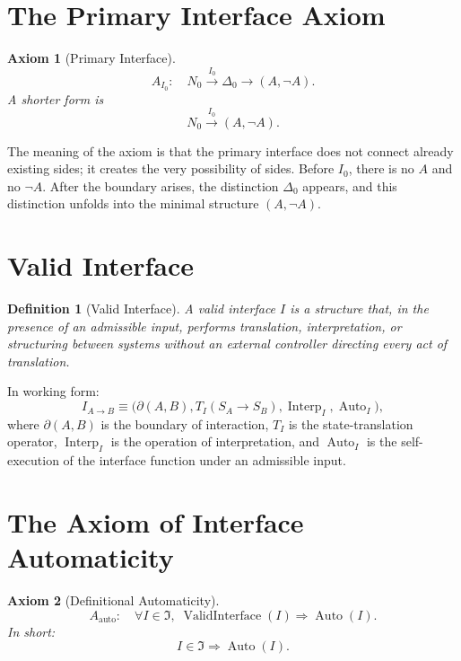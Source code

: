 \documentclass[12pt,a4paper]{article}
\newtheorem{definition}{Definition}
\newtheorem{axiom}{Axiom}
\DeclareMathOperator{\Valid}{ValidInterface}
\DeclareMathOperator{\Auto}{Auto}
\newcommand{\Ispace}{\mathfrak I}
\begin{document}
\section{The Primary Interface Axiom}
\begin{axiom}[Primary Interface]
\begin{equation}
\boxed{A_{I_0}:\quad N_0\xrightarrow{I_0}\Delta_0\to(A,\neg A).}
\end{equation}
A shorter form is
\begin{equation}
\boxed{N_0\xrightarrow{I_0}(A,\neg A).}
\end{equation}
\end{axiom}

The meaning of the axiom is that the primary interface does not connect already existing sides; it creates the very possibility of sides. Before \(I_0\), there is no \(A\) and no \(\neg A\). After the boundary arises, the distinction \(\Delta_0\) appears, and this distinction unfolds into the minimal structure \((A,\neg A)\).

\section{Valid Interface}
\begin{definition}[Valid Interface]
A valid interface \(I\) is a structure that, in the presence of an admissible input, performs translation, interpretation, or structuring between systems without an external controller directing every act of translation.
\end{definition}

In working form:
\begin{equation}
I_{A\to B}\equiv\bigl(\partial(A,B),T_I(S_A\to S_B),\operatorname{Interp}_I,\Auto_I\bigr),
\end{equation}
where \(\partial(A,B)\) is the boundary of interaction, \(T_I\) is the state-translation operator, \(\operatorname{Interp}_I\) is the operation of interpretation, and \(\Auto_I\) is the self-execution of the interface function under an admissible input.

\section{The Axiom of Interface Automaticity}
\begin{axiom}[Definitional Automaticity]
\begin{equation}
\boxed{A_{\mathrm{auto}}:\quad \forall I\in\Ispace,\;\Valid(I)\Rightarrow\Auto(I).}
\end{equation}
In short:
\begin{equation}
\boxed{I\in\Ispace\Rightarrow\Auto(I).}
\end{equation}
\end{axiom}
\end{document}

